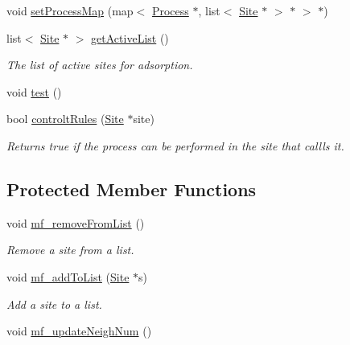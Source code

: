 \begin{DoxyCompactItemize}
void \mbox{\hyperlink{classMicroProcesses_1_1Adsorption_ab64c4f96f4b1b612db57c90c82140e3b}{set\+Process\+Map}} (map$<$ \mbox{\hyperlink{classMicroProcesses_1_1Process}{Process}} $\ast$, list$<$ \mbox{\hyperlink{classSurfaceTiles_1_1Site}{Site}} $\ast$ $>$ $\ast$ $>$ $\ast$)
\item 
\mbox{\label{classMicroProcesses_1_1Adsorption_ac8bab3e2a04a6ea204c8f31077fb83fb}} 
list$<$ \mbox{\hyperlink{classSurfaceTiles_1_1Site}{Site}} $\ast$ $>$ \mbox{\hyperlink{classMicroProcesses_1_1Adsorption_ac8bab3e2a04a6ea204c8f31077fb83fb}{get\+Active\+List}} ()
\begin{DoxyCompactList}\small\item\em The list of active sites for adsorption. \end{DoxyCompactList}\item 
void \mbox{\hyperlink{classMicroProcesses_1_1Adsorption_a891d1db6714ecbe9c3f698febc376652}{test}} ()
\item 
\mbox{\label{classMicroProcesses_1_1Adsorption_ae234d5e6fe93a898dc5893a55117a34a}} 
bool \mbox{\hyperlink{classMicroProcesses_1_1Adsorption_ae234d5e6fe93a898dc5893a55117a34a}{controlt\+Rules}} (\mbox{\hyperlink{classSurfaceTiles_1_1Site}{Site}} $\ast$site)
\begin{DoxyCompactList}\small\item\em Returns true if the process can be performed in the site that callls it. \end{DoxyCompactList}\end{DoxyCompactItemize}
\subsection*{Protected Member Functions}
\begin{DoxyCompactItemize}
\item 
\mbox{\label{classMicroProcesses_1_1Adsorption_a9c807426af10a4f2ff89abf7d774307f}} 
void \mbox{\hyperlink{classMicroProcesses_1_1Adsorption_a9c807426af10a4f2ff89abf7d774307f}{mf\+\_\+remove\+From\+List}} ()
\begin{DoxyCompactList}\small\item\em Remove a site from a list. \end{DoxyCompactList}\item 
\mbox{\label{classMicroProcesses_1_1Adsorption_a0bef9ba6310dcd4fece5add56e3cacfb}} 
void \mbox{\hyperlink{classMicroProcesses_1_1Adsorption_a0bef9ba6310dcd4fece5add56e3cacfb}{mf\+\_\+add\+To\+List}} (\mbox{\hyperlink{classSurfaceTiles_1_1Site}{Site}} $\ast$s)
\begin{DoxyCompactList}\small\item\em Add a site to a list. \end{DoxyCompactList}\item 
void \mbox{\hyperlink{classMicroProcesses_1_1Adsorption_a21cf31bffb1e123fb683c6f0c76b8717}{mf\+\_\+update\+Neigh\+Num}} ()
\end{DoxyCompactItemize}
